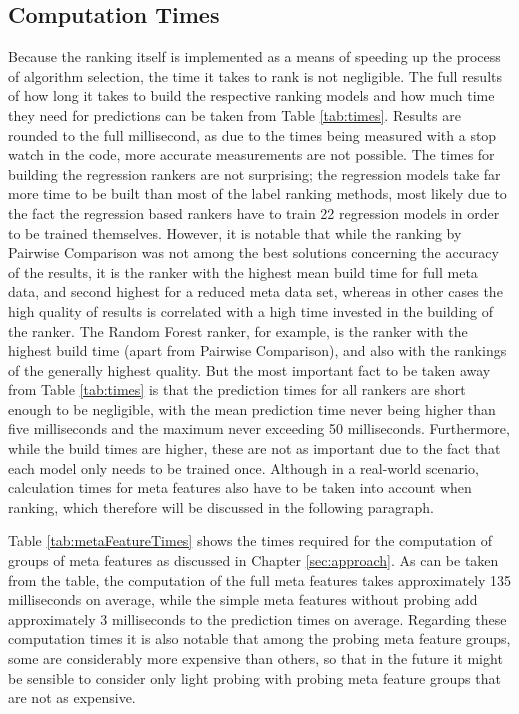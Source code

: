 \subsection{Computation Times}

Because the ranking itself is implemented as a means of speeding up the process of algorithm selection, the time it takes to rank is not negligible. The full results of how long it takes to build the respective ranking models and how much time they need for predictions can be taken from Table \ref{tab:times}. Results are rounded to the full millisecond, as due to the times being measured with a stop watch in the code, more accurate measurements are not possible. The times for building the regression rankers are not surprising; the regression models take far more time to be built than most of the label ranking methods, most likely due to the fact the regression based rankers have to train 22 regression models in order to be trained themselves. However, it is notable that while the ranking by Pairwise Comparison was not among the best solutions concerning the accuracy of the results, it is the ranker with the highest mean build time for full meta data, and second highest for a reduced meta data set, whereas in other cases the high quality of results is correlated with a high time invested in the building of the ranker. The Random Forest ranker, for example, is the ranker with the highest build time (apart from Pairwise Comparison), and also with the rankings of the generally highest quality. But the most important fact to be taken away from Table \ref{tab:times} is that the prediction times for all rankers are short enough to be negligible, with the mean prediction time never being higher than five milliseconds and the maximum never exceeding 50 milliseconds. Furthermore, while the build times are higher, these are not as important due to the fact that each model only needs to be trained once. Although in a real-world scenario, calculation times for meta features also have to be taken into account when ranking, which therefore will be discussed in the following paragraph.



Table \ref{tab:metaFeatureTimes} shows the times required for the computation of groups of meta features as discussed in Chapter \ref{sec:approach}. As can be taken from the table, the computation of the full meta features takes approximately 135 milliseconds on average, while the simple meta features without probing add approximately 3 milliseconds to the prediction times on average. Regarding these computation times it is also notable that among the probing meta feature groups, some are considerably more expensive than others, so that in the future it might be sensible to consider only light probing with probing meta feature groups that are not as expensive.

